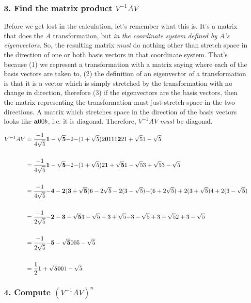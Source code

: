 \subsubsection{3. Find the matrix product $V^{-1}AV$}

Before we get lost in the calculation, let's remember what this is. It's a
matrix that does the $A$ transformation, but \textit{in the coordinate system defined
by $A$'s eigenvectors}. So, the resulting matrix \textit{must} do nothing other than
stretch space in the direction of one or both basis vectors in that coordinate
system. That's because (1) we represent a transformation with a matrix saying
where each of the basis vectors are taken to, (2) the definition of an
eigenvector of a transformation is that it is a vector which is simply
stretched by the transformation with no change in direction, therefore (3) if
the eigenvectors are the basis vectors, then the matrix representing the
transformation must just stretch space in the two directions. A matrix which
stretches space in the direction of the basis vectors looks like
$\tiny{\mathbf{a}{0}{0}{b}}$, i.e. it is diagonal. Therefore, $V^{-1}AV$ \textit{must} be
diagonal.

\begin{align*}
V^{-1}AV &=
\frac{-1}{4\sqrt 5}
\mathbf{1 - \sqrt 5 }{-2}
    {-(1 + \sqrt 5)}{2}
\mathbf{0}{1}
    {1}{1}
\mathbf{2          }{2          }
    {1 + \sqrt 5}{1 - \sqrt 5}
\\\\
&=
\frac{-1}{4\sqrt 5}
\mathbf{1 - \sqrt 5 }{-2}
    {-(1 + \sqrt 5)}{2}
\mathbf{1 + \sqrt 5}{1 - \sqrt 5}
    {3 + \sqrt 5}{3 - \sqrt 5}
\\\\
&=
\frac{-1}{4\sqrt 5}
\mathbf{-4 - 2(3 + \sqrt 5)             }{6 - 2\sqrt 5 - 2(3 - \sqrt 5)}
    {-(6 + 2\sqrt 5) + 2(3 + \sqrt 5)}{4 + 2(3 - \sqrt 5)}
\\\\
&=
\frac{-1}{2\sqrt 5}
\mathbf{-2 - 3 - \sqrt 5}{3 - \sqrt 5 - 3 + \sqrt 5}
    {-3 - \sqrt 5 + 3 + \sqrt 5}{2 + 3 - \sqrt 5}
\\\\
&=
\frac{-1}{2\sqrt 5}
\mathbf{-5 - \sqrt 5}{0          }
    {0           }{5 - \sqrt 5}
\\\\
&=
\frac{1}{2}
\mathbf{1 + \sqrt 5}{0          }
    {0          }{1 - \sqrt 5}
\end{align*}

\subsubsection{4. Compute $(V^{-1}AV)^n$}

